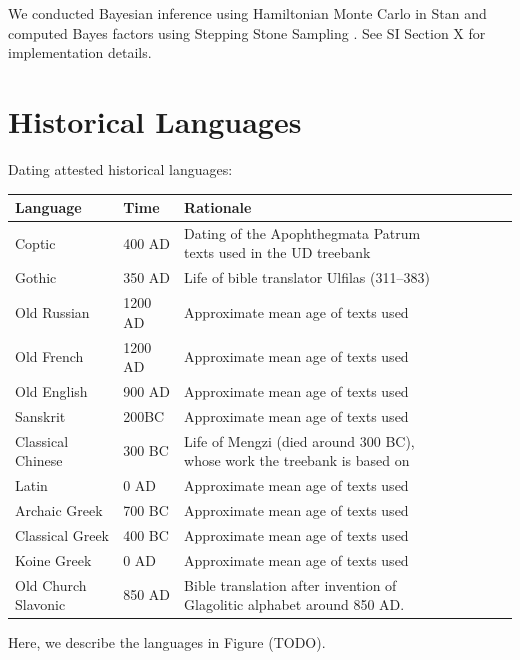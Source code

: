 \documentclass[11pt,a4paper]{article}
\begin{document}
We conducted Bayesian inference using Hamiltonian Monte Carlo in Stan \citep{homan2014the,carpenter2017stan} and computed Bayes factors using Stepping Stone Sampling \citep{xie2011improving}.
See SI Section X for implementation details.







\appendix

\section{Historical Languages}


Dating attested historical languages:

\begin{tabular}{llp{10cm}llll}
Language & Time & Rationale \\ \hline
Coptic & 400 AD & Dating of the Apophthegmata Patrum texts used in the UD treebank\\
Gothic & 350 AD & Life of bible translator Ulfilas (311--383)\\
Old Russian & 1200 AD & Approximate mean age of texts used\\
Old French & 1200 AD  & Approximate mean age of texts used\\
Old English & 900 AD & Approximate mean age of texts used \\
Sanskrit & 200BC & Approximate mean age of texts used \\
Classical Chinese & 300 BC & Life of Mengzi (died around 300 BC), whose work the treebank is based on \\
Latin & 0 AD & Approximate mean age of texts used \\
Archaic Greek & 700 BC & Approximate mean age of texts used \\
Classical Greek & 400 BC & Approximate mean age of texts used \\
Koine Greek & 0 AD  & Approximate mean age of texts used\\
Old Church Slavonic & 850 AD &  Bible translation after invention of Glagolitic alphabet around 850 AD. \\
\end{tabular}

Here, we describe the languages in Figure (TODO).
\end{document}
